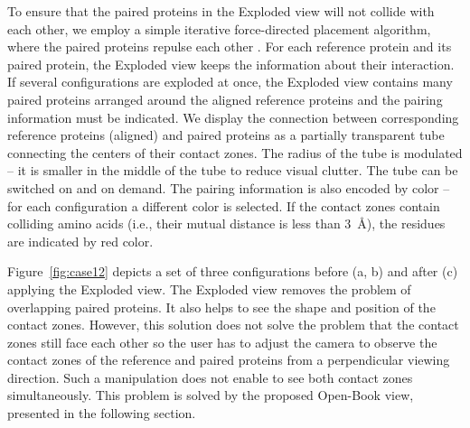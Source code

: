 \documentclass{bmcart}
\def\OpBook {Open-Book view\xspace}
\def\ExpView {Exploded view\xspace}
\begin{document}
To ensure that the paired proteins in the Exploded view will not collide with each other, we employ a simple iterative force-directed placement algorithm, where the paired proteins repulse each other \cite{fruchterman1991graph}.
For each reference protein and its paired protein, the \ExpView keeps the information about their interaction.
If several configurations are exploded at once, the \ExpView contains many paired proteins arranged around the aligned reference proteins and the pairing information must be indicated.
We display the connection between corresponding reference proteins (aligned) and paired proteins as a partially transparent tube connecting the centers of their contact zones.
The radius of the tube is modulated -- it is smaller in the middle of the tube to reduce visual clutter.
The tube can be switched on and on demand.
The pairing information is also encoded by color -- for each configuration a different color is selected.
If the contact zones contain colliding amino acids (i.e., their mutual distance is less than 3~\AA), the residues are indicated by red color.

Figure~\ref{fig:case12} depicts a set of three configurations before (a, b) and after (c) applying the \ExpView.
The Exploded view removes the problem of overlapping paired proteins.
It also helps to see the shape and position of the contact zones.
However, this solution does not solve the problem that the contact zones still face each other so the user has to adjust the camera to observe the contact zones of the reference and paired proteins from a perpendicular viewing direction. 
Such a manipulation does not enable to see both contact zones simultaneously.
This problem is solved by the proposed \OpBook, presented in the following section.
\end{document}
